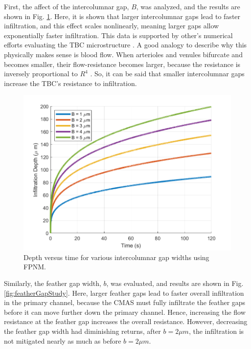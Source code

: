 \documentclass{UCF_ETD}
\begin{document}
First, the affect of the intercolumnar gap, $B$, was analyzed, and the results are shown in Fig. \ref{fig:columnGapStudy}. 
Here, it is shown that larger intercolumnar gaps lead to faster infiltration, and this effect scales nonlinearly, meaning larger gaps allow exponentially faster infiltration. 
This data is supported by other's numerical efforts evaluating the TBC microstructure \cite{Sirigiri2018}.
A good analogy to describe why this physically makes sense is blood flow. When arterioles and venules bifurcate and becomes smaller, their flow-resistance becomes larger, because the resistance is inversely proportional to $R^{4}$ \cite{Chandran2012}. So, it can be said that smaller intercolumnar gaps increase the TBC's resistance to infiltration.

\begin{figure}[htp!]
    \centering
    \includegraphics[width=\linewidth]{Figures/intercolumnarGapStudy.png}
    \caption{Depth versus time for various intercolumnar gap widths using FPNM.}
    \label{fig:columnGapStudy}
\end{figure}

Similarly, the feather gap width, $b$, was evaluated, and results are shown in Fig. \ref{fig:featherGapStudy}. 
Here, larger feather gaps lead to faster overall infiltration in the primary channel, because the CMAS must fully infiltrate the feather gaps before it can move further down the primary channel. Hence, increasing the flow resistance at the feather gap increases the overall resistance. 
However, decreasing the feather gap width had diminishing returns, after $b = 2 \mu m$, the infiltration is not mitigated nearly as much as before $b=2 \mu m$.
\end{document}
